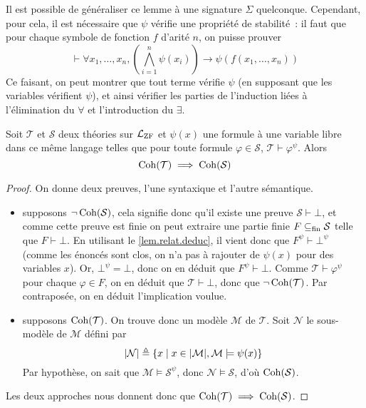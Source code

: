 \begin{remark}
  Il est possible de généraliser ce lemme à une signature $\Sigma$ quelconque.
  Cependant, pour cela, il est nécessaire que $\psi$ vérifie une propriété de
  stabilité~: il faut que pour chaque symbole de fonction $f$ d'arité $n$,
  on puisse prouver
  \[\vdash\forall x_1,\ldots,x_n, \left(\bigwedge_{i = 1}^n \psi(x_i)\right)
  \to \psi(f(x_1,\ldots,x_n))\]
  Ce faisant, on peut montrer que tout terme vérifie $\psi$ (en supposant que
  les variables vérifient $\psi$), et ainsi vérifier les parties de l'induction
  liées à l'élimination du $\forall$ et l'introduction du $\exists$.
\end{remark}

\begin{theorem}
  Soit $\mathcal T$ et $\mathcal S$ deux théories sur $\mathcal L_{\operatorname{ZF}}$ et
  $\psi(x)$ une formule à une variable libre dans ce même langage telles que
  pour toute formule
  $\varphi \in \mathcal S$, $\mathcal T\vdash \varphi^\psi$. Alors
  \[\operatorname{Coh}(\mathcal T) \implies \operatorname{Coh}(\mathcal S)\]
\end{theorem}

\begin{proof}
  On donne deux preuves, l'une syntaxique et l'autre sémantique.
  \begin{itemize}
  \item supposons $\lnot\operatorname{Coh}(\mathcal S)$, cela signifie donc qu'il existe une
    preuve $\mathcal S\vdash \bot$, et comme cette preuve est finie on peut
    extraire une partie finie $F\subseteq_{\mathrm{fin}} \mathcal S$ telle que $F\vdash \bot$.
    En utilisant le \cref{lem.relat.deduc}, il vient donc que
    $F^\psi\vdash \bot^\psi$ (comme les énoncés sont clos, on n'a pas à rajouter
    de $\psi(x)$ pour des variables $x$). Or, $\bot^\psi = \bot$, donc on en
    déduit que $F^\psi\vdash \bot$. Comme $\mathcal T\vdash \varphi^\psi$ pour
    chaque $\varphi \in F$, on en déduit que $\mathcal T\vdash \bot$, donc que
    $\lnot\operatorname{Coh}(\mathcal T)$. Par contraposée, on en déduit l'implication
    voulue.
  \item supposons $\operatorname{Coh}(\mathcal T)$. On trouve donc un modèle $\mathcal M$
    de $\mathcal T$. Soit $\mathcal N$ le sous-modèle de $\mathcal M$ défini
    par
    \[|\mathcal N|\triangleq \{x \mid x\in |\mathcal M|,
    \mathcal M\models \psi(x)\}\]
    Par hypothèse, on sait que $\mathcal M\models \mathcal S^\psi$, donc
    $\mathcal N\models \mathcal S$, d'où $\operatorname{Coh}(\mathcal S)$.
  \end{itemize}

  Les deux approches nous donnent donc que
  $\operatorname{Coh}(\mathcal T) \implies \operatorname{Coh}(\mathcal S)$.
\end{proof}

